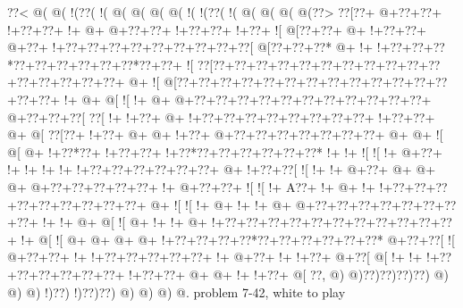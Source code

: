 \vbox{\vbox{\goo
\0??<\- @(\- @(\- !(\0??(\- !(\- @(\- @(\- @(\- @(\- !(\- !(\0??(\- !(\- @(\- @(\- @(\- @(\0??>
\0??[\0??+\- @+\0??+\0??+\- !+\0??+\0??+\- !+\- @+\- @+\0??+\0??+\- !+\0??+\0??+\- !+\0??+\- ![
\- @[\0??+\0??+\- @+\- !+\0??+\0??+\- @+\0??+\- !+\0??+\0??+\0??+\0??+\0??+\0??+\0??+\0??+\0??[
\- @[\0??+\0??+\0??*\- @+\- !+\- !+\0??+\0??+\0??*\0??+\0??+\0??+\0??+\0??+\0??*\0??+\0??+\- ![
\0??[\0??+\0??+\0??+\0??+\0??+\0??+\0??+\0??+\0??+\0??+\0??+\0??+\0??+\0??+\0??+\0??+\- @+\- ![
\- @[\0??+\0??+\0??+\0??+\0??+\0??+\0??+\0??+\0??+\0??+\0??+\0??+\0??+\0??+\0??+\- !+\- @+\- @[
\- ![\- !+\- @+\- @+\0??+\0??+\0??+\0??+\0??+\0??+\0??+\0??+\0??+\0??+\0??+\- @+\0??+\0??+\0??[
\0??[\- !+\- !+\0??+\- @+\- !+\0??+\0??+\0??+\0??+\0??+\0??+\0??+\0??+\- !+\0??+\0??+\- @+\- @[
\0??[\0??+\- !+\0??+\- @+\- @+\- !+\0??+\- @+\0??+\0??+\0??+\0??+\0??+\0??+\0??+\- @+\- @+\- ![
\- @[\- @+\- !+\0??*\0??+\- !+\0??+\0??+\- !+\0??*\0??+\0??+\0??+\0??+\0??+\0??*\- !+\- !+\- ![
\- ![\- !+\- @+\0??+\- !+\- !+\- !+\- !+\- !+\0??+\0??+\0??+\0??+\0??+\0??+\- @+\- !+\0??+\0??[
\- ![\- !+\- !+\- @+\0??+\- @+\- @+\- @+\- @+\0??+\0??+\0??+\0??+\0??+\- !+\- @+\0??+\0??+\- ![
\- ![\- !+\!  A\0??+\- !+\- @+\- !+\- !+\0??+\0??+\0??+\0??+\0??+\0??+\0??+\0??+\0??+\- @+\- ![
\- ![\- !+\- @+\- !+\- !+\- @+\- @+\0??+\0??+\0??+\0??+\0??+\0??+\0??+\0??+\- !+\- !+\- @+\- @[
\- ![\- @+\- !+\- !+\- @+\- !+\0??+\0??+\0??+\0??+\0??+\0??+\0??+\0??+\0??+\0??+\0??+\- !+\- @[
\- ![\- @+\- @+\- @+\- @+\- !+\0??+\0??+\0??+\0??*\0??+\0??+\0??+\0??+\0??+\0??*\- @+\0??+\0??[
\- ![\- @+\0??+\0??+\- !+\- !+\0??+\0??+\0??+\0??+\0??+\- !+\- @+\0??+\- !+\- !+\0??+\- @+\0??[
\- @[\- !+\- !+\- !+\0??+\0??+\0??+\0??+\0??+\0??+\- !+\0??+\0??+\- @+\- @+\- !+\- !+\0??+\- @[
\0??,\- @)\- @)\0??)\0??)\0??)\0??)\- @)\- @)\- @)\- !)\0??)\- !)\0??)\0??)\- @)\- @)\- @)\- @.
}
\hfil problem 7-42, white to play\hfil\break
}

